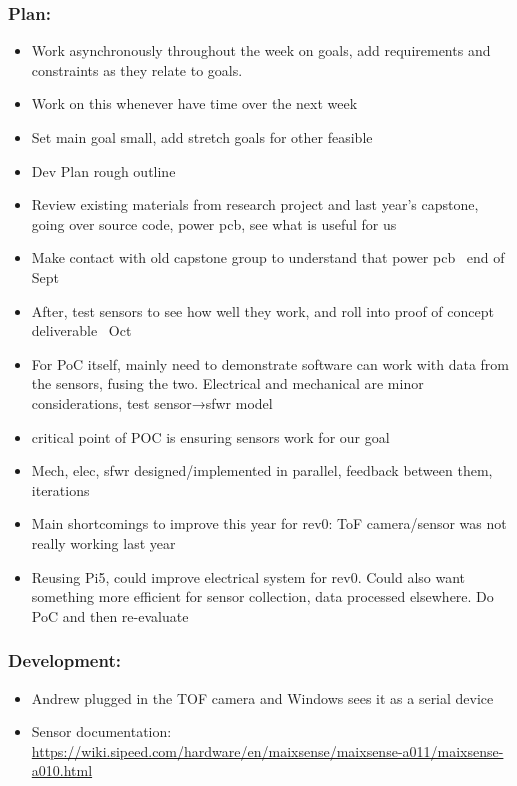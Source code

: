 \documentclass{article}
\begin{document}
			\subsubsection*{Plan:} 
				\begin{itemize}
					\item Work asynchronously throughout the week on goals, add requirements and constraints as they relate to goals.	 
					\item Work on this whenever have time over the next week 
					\item Set main goal small, add stretch goals for other feasible 
					\item Dev Plan rough outline 
					\item Review existing materials from research project and last year’s capstone, going over source code, power pcb, see what is useful for us 
					\item Make contact with old capstone group to understand that power pcb ~end of Sept 
					\item After, test sensors to see how well they work, and roll into proof of concept deliverable ~Oct 
					\item For PoC itself, mainly need to demonstrate software can work with data from the sensors, fusing the two. Electrical and mechanical are minor considerations, test sensor→sfwr model 
					\item critical point of POC is ensuring sensors work for our goal 
					\item Mech, elec, sfwr designed/implemented in parallel, feedback between them, iterations 
					\item Main shortcomings to improve this year for rev0: ToF camera/sensor was not really working last year 
					\item Reusing Pi5, could improve electrical system for rev0. Could also want something more efficient for sensor collection, data processed elsewhere. Do PoC and then re-evaluate 
				\end{itemize}
			\subsubsection*{Development:}
				\begin{itemize}
					\item Andrew plugged in the TOF camera and Windows sees it as a serial device
					\item Sensor documentation:\\
				\url{https://wiki.sipeed.com/hardware/en/maixsense/maixsense-a011/maixsense-a010.html}	
				\end{itemize}
\end{document}

